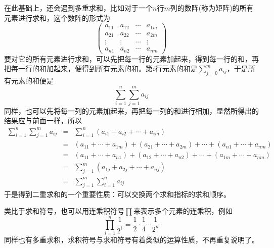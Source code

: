 在此基础上，还会遇到多重求和，比如对于一个$n$行$m$列的数阵(称为矩阵)的所有元素进行求和，这个数阵的形式为
\[
  \begin{pmatrix}
    a_{11} & a_{12} & \cdots & a_{1m} \\
    a_{21} & a_{22} & \cdots & a_{2m} \\
    \vdots & \vdots & \cdots & \vdots \\
    a_{n1} & a _{n2} & \cdots & a_{nm}
  \end{pmatrix}
\]
要对它的所有元素进行求和，可以先把每一行的元素加起来，得到每一行的和，再把每一行的和加起来，便得到所有元素的和。第$i$行元素的和是$\sum_{j=0}^ma_{ij}$，于是所有元素的和便是
\[ \sum_{i=1}^n \sum_{j=1}^m a_{ij} \]
同样，也可以先将每一列的元素加起来，再把每一列的和进行相加，显然所得出的结果应与前面一样，所以
\begin{eqnarray*}
  \sum_{i=1}^n \sum_{j=1}^m a_{ij} & = & \sum_{i=1}^n(a_{i1}+a_{i2}+\cdots+a_{im}) \\
                                   & = & (a_{11}+\cdots+a_{1m})+(a_{21}+\cdots+a_{2m})+\cdots+(a_{n1}+\cdots+a_{nm}) \\
                                   & = & (a_{11}+\cdots+a_{n1})+(a_{12}+\cdots+a_{n2})+\cdots+(a_{1m}+\cdots+a_{nm}) \\
                                   & = & \sum_{j=1}^m(a_{1j}+a_{2j}+\cdots+a_{nj}) \\
  & = & \sum_{j=1}^m\sum_{i=1}^na_{ij}
\end{eqnarray*}
于是得到二重求和的一个重要性质：可以交换两个求和指标的求和顺序。

类比于求和符号，也可以用连乘积符号$\prod$来表示多个元素的连乘积，例如
\[ \prod_{i=1}^n \frac{1}{2^i} = \frac{1}{2} \cdot \frac{1}{4} \cdots \frac{1}{2^n} \]
同样也有多重求积，求积符号与求和符号有着类似的运算性质，不再重复说明了。


